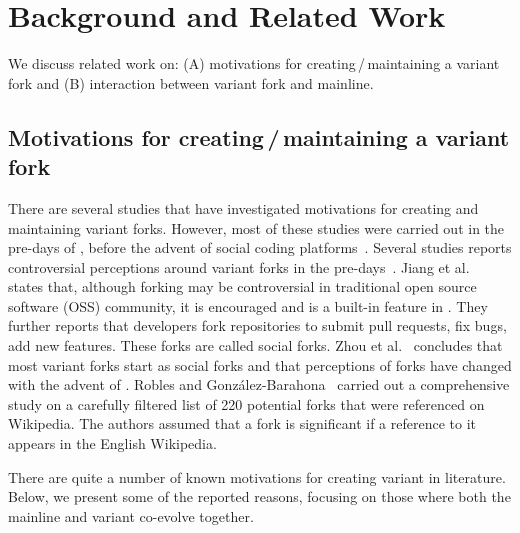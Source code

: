 \section{Background and Related Work}
\label{sec:background}
We discuss related work on: (A) motivations for creating\,/\,maintaining a variant fork and (B) interaction between variant fork and mainline.%



\subsection{Motivations for creating\,/\,maintaining a variant fork}
\label{sec:motivations}

There are several studies that have investigated motivations for creating and maintaining variant forks. However, most of these studies were carried out in the pre-\gh days of \sourceforge, before the advent of social coding platforms~\cite{Linus:2012Perspectives,Gregorio:2012,Viseur:2012Forks,Linus:2013CodeForking,Laurent:2008,Linus:2011ToFork}. Several studies reports controversial perceptions around variant forks in the pre-\gh days~\cite{Chua:Forking:2017,Dixion:2009Forks,Ernst:2010,Linus:2011ToFork,Linus:2014Hackers,Raymond:Cathedral:2001,pete}.
Jiang et al.~\cite{Lo:2017} states that, although forking may be controversial in traditional open source software (OSS) community, it is encouraged and is a built-in feature in \gh. They further reports that developers fork repositories to submit pull requests, fix bugs, add new features. These forks are called social forks.
Zhou et al.~\cite{Zhou:2020} concludes that most variant forks start as social forks
and that perceptions of forks have changed with the advent of \gh.
%
Robles and Gonz{\'a}lez-Barahona~\cite{Gregorio:2012} carried out a comprehensive study on a carefully filtered list of 220 potential forks that were referenced on Wikipedia. The authors assumed that a fork is significant if a reference to it appears in the English Wikipedia.

There are quite a number of known motivations for creating variant in literature. Below, we present some of the reported reasons, focusing on those where both the mainline and variant co-evolve together.

